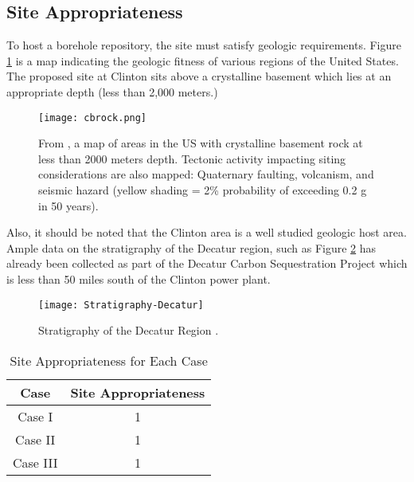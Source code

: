  \subsection{Site Appropriateness} 

  To host a borehole repository, the site must satisfy geologic requirements. 
  Figure \ref{fig:cbrock} is a map indicating the geologic fitness of various 
  regions of the United States. The proposed site at Clinton sits above 
  a crystalline basement which lies at an appropriate depth (less than 2,000 
  meters.)

\begin{figure}[!h] 
  \centering
  \texttt{[image: cbrock.png]}	
        \caption{From \cite{perry_gis_2015}, a map of areas in the US with 
        crystalline basement rock at less than 2000 meters depth. Tectonic 
        activity impacting siting considerations are also mapped:  Quaternary 
        faulting, volcanism, and seismic hazard (yellow shading = 2\% 
        probability of exceeding 0.2 g in 50 years).}
  \label{fig:cbrock}
\end{figure}

  
  \iffalse

\begin{figure}[!h] 
  \centering
  \texttt{[image: Crystalline-Thickness]}	
  \caption{Depth of Crystalline Rock
  \cite{perry_gis_2015}.}
  \label{fig:Depth}
\end{figure}

 \fi
  
  
  Also, it should be noted that the Clinton area is a well studied geologic 
  host area. Ample data on the stratigraphy of the Decatur region, such as  
  Figure \ref{fig:Stratigraphy} has already been collected as part of the 
  Decatur Carbon Sequestration Project which is less than 50 miles south of the 
  Clinton power plant.
 
\begin{figure}[!h] 
  \centering
  \texttt{[image: Stratigraphy-Decatur]}	
  \caption{Stratigraphy of the Decatur Region
  \cite{mcdonald_illinois_2012}.}
  \label{fig:Stratigraphy}
\end{figure}
  
\begin{table}[h]
	\centering
        \caption {Site Appropriateness for Each Case}
		\begin{tabular}{|c|c|}
			\hline
			Case & Site Appropriateness \\
			\hline
			Case I & 1 \\
			Case II & 1 \\
			Case III & 1\\ 
			\hline
                \end{tabular}
\end{table}

